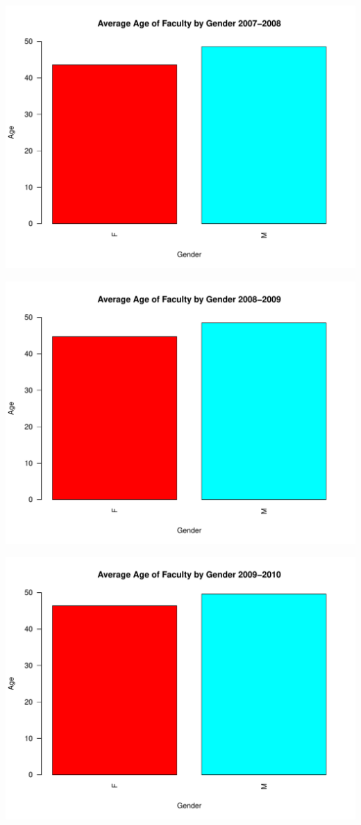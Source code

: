 \documentclass[12pt,a4paper]{article}\usepackage[]{graphicx}\usepackage[]{color}
\makeatletter
\def\maxwidth{ %
  \ifdim\Gin@nat@width>\linewidth
    \linewidth
  \else
    \Gin@nat@width
  \fi
}
\newenvironment{knitrout}{}{} %
\theoremstyle{definition}
\makeatother
\begin{document}
\begin{knitrout}
\includegraphics[width=\maxwidth]{figure/unnamed-chunk-11-4} 

\includegraphics[width=\maxwidth]{figure/unnamed-chunk-11-5} 

\includegraphics[width=\maxwidth]{figure/unnamed-chunk-11-6} 


\end{knitrout}
\end{document}
